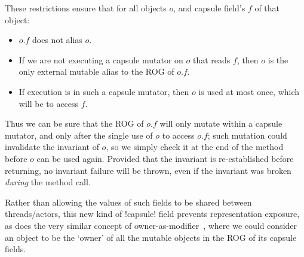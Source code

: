 These restrictions ensure that for all objects $o$, and capsule field's $f$ of that object:
\begin{itemize}
	\item $o.f$ does not alias $o$.
	\item If we are not executing a capsule mutator on $o$ that reads $f$, then $o$ is the only external mutable alias to the ROG of $o.f$.
	\item If execution is in such a capsule mutator, then $o$ is used at most once, which will be to access $f$. 
\end{itemize} 
Thus we can be sure that the ROG of $o.f$ will only mutate within a capsule mutator, and only after the single use of $o$ to access $o.f$; such mutation could invalidate the invariant of $o$, so we simply check it at the end of the method before $o$ can be used again. Provided that the invariant is re-established before returning, no invariant failure will be thrown, even if the invariant was broken \emph{during} the method call.

 
Rather than allowing the values of such fields to be shared between threads/actors, this new kind of \Q!capsule! field prevents representation exposure, as does the very similar concept of owner-as-modifier~\cite{?}, where we could consider an object to be the `owner' of all the mutable objects in the ROG of its capsule fields.

